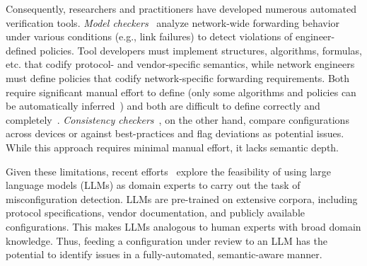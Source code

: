 Consequently, researchers and practitioners have developed numerous automated verification tools.
{\em Model checkers}~\cite{fogel2015general, beckett2017general, abhashkumar2020tiramisu, prabhu2020plankton, zhang2022sre, steffen2020netdice, ye2020hoyan, ritchey2000using,al2011configchecker, jeffrey2009model} analyze network-wide forwarding behavior under various conditions (e.g., link failures) to detect violations of engineer-defined policies. Tool developers must implement structures, algorithms, formulas, etc. that codify protocol- and vendor-specific semantics, while network engineers must define policies that codify network-specific forwarding requirements. Both require significant manual effort to define (only some algorithms and policies can be automatically inferred~\cite{birkner2020config2spec, kheradmand2020anime, sharma2023prosper}) and both are difficult to define correctly and completely~\cite{ye2020hoyan, birkner2021metha}.
{\em Consistency checkers}~\cite{kakarla2024diffy,kakarla2020finding, le2006minerals, feamster2005detecting, tang2021campion, le2008detecting, le2006characterization}, on the other hand, compare configurations across devices or against best-practices and flag deviations as potential issues.
While this approach requires minimal manual effort, it lacks semantic depth. %

Given these limitations, recent efforts~\cite{bogdanov2024leveraging,chen2024automatic,wang2024identifying,liu2024large, wang2024netconfeval, lian2023configuration} explore the feasibility of using large language models (LLMs) as domain experts to carry out the task of misconfiguration detection. LLMs are pre-trained on extensive corpora,
including protocol specifications, vendor documentation, and publicly available configurations. This makes LLMs analogous to human experts with broad domain knowledge. Thus, feeding a configuration under review to an LLM
has the potential to identify issues in a fully-automated, semantic-aware manner.

